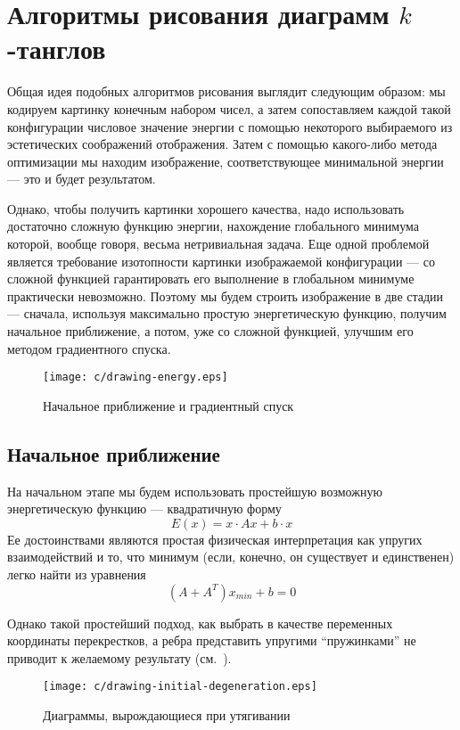 \newpage
\section{Алгоритмы рисования диаграмм $k$-танглов}
	\label{section:drawing}

	Общая идея подобных алгоритмов рисования выглядит следующим образом: мы кодируем картинку конечным
	набором чисел, а затем сопоставляем каждой такой конфигурации числовое значение энергии с помощью
	некоторого выбираемого из эстетических соображений отображения. Затем с помощью какого-либо метода
	оптимизации мы находим изображение, соответствующее минимальной энергии --- это и будет результатом.

	Однако, чтобы получить картинки хорошего качества, надо использовать достаточно сложную функцию
	энергии, нахождение глобального минимума которой, вообще говоря, весьма нетривиальная задача. Еще одной
	проблемой является требование изотопности картинки изображаемой конфигурации --- со сложной
	функцией гарантировать его выполнение в глобальном минимуме практически невозможно. Поэтому мы будем
	строить изображение в две стадии --- сначала, используя максимально простую энергетическую функцию,
	получим начальное приближение, а потом, уже со сложной функцией, улучшим его методом градиентного
	спуска.

	\begin{figure}[ht]
		\centering
		\texttt{[image: c/drawing-energy.eps]}
		\caption{Начальное приближение и градиентный спуск\label{figure:draw-optimization}}
	\end{figure}

	\subsection{Начальное приближение}

	На начальном этапе мы будем использовать простейшую возможную энергетическую функцию ---
	квадратичную форму
	$$
		E(x) = x \cdot Ax + b \cdot x
	$$
	Ее достоинствами являются простая физическая интерпретация как упругих взаимодействий и то, что минимум
	(если, конечно, он существует и единственен) легко найти из уравнения
	$$
		(A + A^T)x_{min} + b = 0
	$$

	Однако такой простейший подход, как выбрать в качестве переменных координаты перекрестков, а ребра представить
	упругими ``пружинками'' не приводит к желаемому результату (см.~).
	\begin{figure}[ht]
		\centering
		\texttt{[image: c/drawing-initial-degeneration.eps]}
		\caption{Диаграммы, вырождающиеся при утягивании\label{figure:degenerate-elastic}}
	\end{figure}

